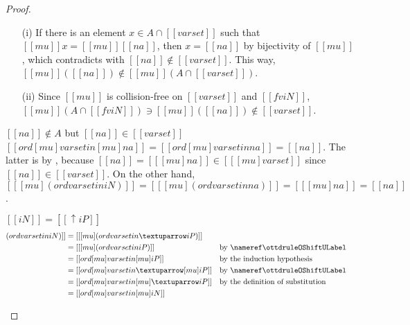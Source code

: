\begin{proof}
\begin{caseof}
\begin{caseof}
       \begin{enumerate}
       \item[(i)] If there is an element $x \in A \cap [[varset]]$ such that
         $[[mu]] x = [[mu]] [[na]]$, then $x = [[na]]$ by bijectivity of
         $[[mu]]$, which contradicts with $[[na]] \notin [[varset]]$. This way, 
         $[[mu]]([[na]]) \notin [[mu]](A \cap [[varset]])$.
       \item[(ii)]
         Since $[[mu]]$ is collision-free on $[[varset]]$ and $[[fv iN]]$,
         $[[mu]] (A \cap [[fv iN]]) \ni [[mu]]([[na]]) \notin [[varset]]$.
       \end{enumerate}

     \item $[[na]] \notin A$ but $[[na]] \in [[varset]]$\\
       $[[ ord [mu] varset in [mu] na ]] = [[ ord [mu] varset in na ]] = [[na]]$.
       The latter is by , because
       $[[na]] = [[ [mu] na ]] \in [[ [mu] varset ]]$ since $[[na]] \in [[varset]]$.
       On the other hand, $[[ [mu] (ord varset in iN) ]] = [[ [mu] (ord varset in na)]] = [[ [mu] na ]] = [[na]]$.
    \end{caseof}
  
  \item $[[iN]] = [[↑iP]]$
    \begin{align*}
       [[ [mu] (ord varset in iN) ]] &= [[ [mu] (ord varset in ↑iP) ]] \\
                                     &= [[ [mu] (ord varset in iP) ]]
                                     && \text{by \ruleref{\ottdruleOShiftULabel}}\\
                                     &= [[ ord [mu]varset in [mu]iP ]]
                                     && \text{by the induction hypothesis}\\
                                     &= [[ ord [mu]varset in  ↑[mu]iP ]]
                                     && \text{by \ruleref{\ottdruleOShiftULabel}}\\
                                     &= [[ ord [mu]varset in  [mu]↑iP ]]
                                     && \text{by the definition of substitution}\\
                                     &= [[ ord [mu]varset in  [mu]iN ]]
    \end{align*}
          

\end{caseof}
\end{proof}
